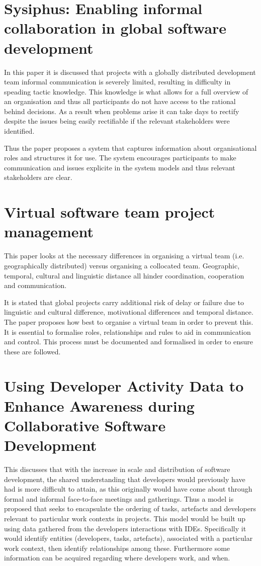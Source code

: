 \documentclass{l4proj}
\begin{document}
\section {Sysiphus: Enabling informal collaboration in global software development}

In this paper it is discussed that projects with a globally distributed development team informal communication is severely limited, resulting in difficulty in speading tactic knowledge.  This knowledge is what allows for a full overview of an organisation and thus all participants do not have access to the rational behind decisions.  As a result when problems arise it can take days to rectify despite the issues being easily rectifiable if the relevant stakeholders were identified.

Thus the paper proposes a system that captures information about organisational roles and structures it for use.  The system encourages participants to make communication and issues explicite in the system models and thus relevant stakeholders are clear.

\section {Virtual software team project management}

This paper looks at the necessary differences in organising a virtual team (i.e. geographically distributed) versus organising a collocated team.  Geographic, temporal, cultural and linguistic distance all hinder coordination, cooperation and communication. 

It is stated that global projects carry additional risk of delay or failure due to linguistic and cultural difference, motivational differences and temporal distance.  The paper proposes how best to organise a virtual team in order to prevent this.  It is essential to formalise roles, relationships and rules to aid in communication and control.  This process must be documented and formalised in order to ensure these are followed. 

\section {Using Developer Activity Data to Enhance Awareness during Collaborative Software Development}

This discusses that with the increase in scale and distribution of software development, the shared understanding that developers would previously have had is more difficult to attain, as this originally would have come about through formal and informal face-to-face meetings and gatherings.  Thus a model is proposed that seeks to encapsulate the ordering of tasks, artefacts and developers relevant to particular work contexts in projects.  This model would be built up using data gathered from the developers interactions with IDEs.  Specifically it would identify entities (developers, tasks, artefacts), associated with a particular work context, then identify relationships among these. Furthermore some information can be acquired regarding where developers work, and when.
\end{document}
